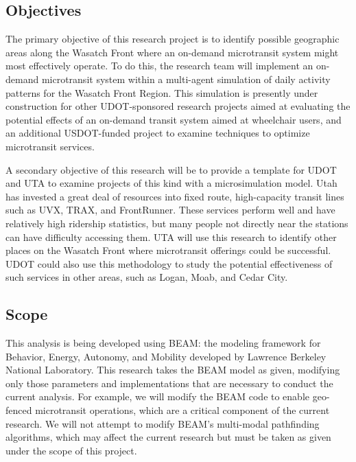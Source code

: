 \documentclass[
]{article}
\begin{document}
\hypertarget{objectives}{%
\subsection{Objectives}\label{objectives}}

The primary objective of this research project is to identify possible geographic areas along the Wasatch Front where an on-demand microtransit system might most effectively operate. To do this, the research team will implement an on-demand microtransit system within a multi-agent simulation of daily activity patterns for the Wasatch Front Region. This simulation is presently under construction for other UDOT-sponsored research projects aimed at evaluating the potential effects of an on-demand transit system aimed at wheelchair users, and an additional USDOT-funded project to examine techniques to optimize microtransit services.

A secondary objective of this research will be to provide a template for UDOT and UTA to examine projects of this kind with a microsimulation model. Utah has invested a great deal of resources into fixed route, high-capacity transit lines such as UVX, TRAX, and FrontRunner. These services perform well and have relatively high ridership statistics, but many people not directly near the stations can have difficulty accessing them. UTA will use this research to identify other places on the Wasatch Front where microtransit offerings could be successful. UDOT could also use this methodology to study the potential effectiveness of such services in other areas, such as Logan, Moab, and Cedar City.

\hypertarget{scope}{%
\subsection{Scope}\label{scope}}

This analysis is being developed using BEAM: the modeling framework for Behavior, Energy, Autonomy, and Mobility developed by Lawrence Berkeley National Laboratory. This research takes the BEAM model as given, modifying only those parameters and implementations that are necessary to conduct the current analysis. For example, we will modify the BEAM code to enable geo-fenced microtransit operations, which are a critical component of the current research. We will not attempt to modify BEAM's multi-modal pathfinding algorithms, which may affect the current research but must be taken as given under the scope of this project.
\end{document}
